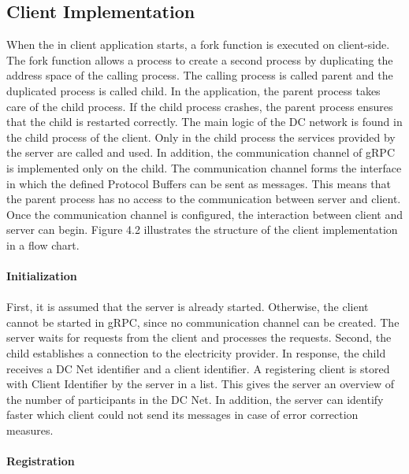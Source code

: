 \subsection{Client Implementation}
When the in client application starts, a fork function is executed on client-side. The fork function allows a process to create a second process by duplicating the address space of the calling process. The calling process is called parent and the duplicated process is called child. In the application, the parent process takes care of the child process. If the child process crashes, the parent process ensures that the child is restarted correctly. The main logic of the DC network is found in the child process of the client. Only in the child process the services provided by the server are called and used. In addition, the communication channel of gRPC is implemented only on the child. The communication channel forms the interface in which the defined Protocol Buffers can be sent as messages. This means that the parent process has no access to the communication between server and client. Once the communication channel is configured, the interaction between client and server can begin. Figure 4.2 illustrates the structure of the client implementation in a flow chart.
\\
\\
\textbf{Initialization}
\\
\\
First, it is assumed that the server is already started. Otherwise, the client cannot be started in gRPC, since no communication channel can be created. The server waits for requests from the client and processes the requests. Second, the child establishes a connection to the electricity provider. In response, the child receives a DC Net identifier and a client identifier. A registering client is stored with Client Identifier by the server in a list. This gives the server an overview of the number of participants in the DC Net. In addition, the server can identify faster which client could not send its messages in case of error correction measures. \\
\\
\textbf{Registration}
\\
\\
